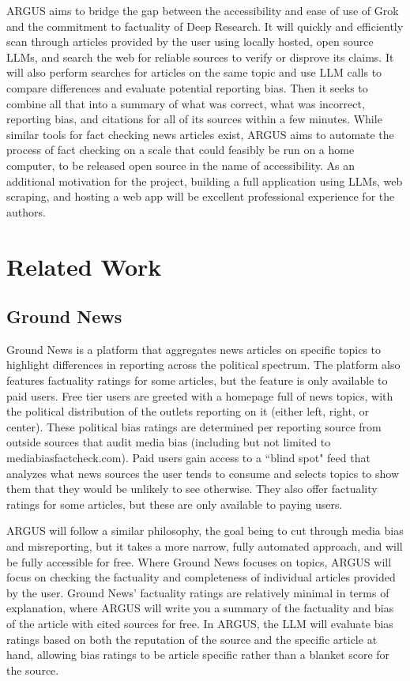 \documentclass[conference]{IEEEtran}
\begin{document}
ARGUS aims to bridge the gap between the accessibility and ease of use of Grok and the commitment to factuality of Deep Research. It will quickly and efficiently scan through articles provided by the user using locally hosted, open source LLMs, and search the web for reliable sources to verify or disprove its claims. It will also perform searches for articles on the same topic and use LLM calls to compare differences and evaluate potential reporting bias. Then it seeks to combine all that into a summary of what was correct, what was incorrect, reporting bias, and citations for all of its sources within a few minutes. While similar tools for fact checking news articles exist, ARGUS aims to automate the process of fact checking on a scale that could feasibly be run on a home computer, to be released open source in the name of accessibility. As an additional motivation for the project, building a full application using LLMs, web scraping, and hosting a web app will be excellent professional experience for the authors.

\section{Related Work}

\subsection{Ground News}
Ground News is a platform that aggregates news articles on specific topics to highlight differences in reporting across the political spectrum\cite{groundNews}. The platform also features factuality ratings for some articles, but the feature is only available to paid users\cite{groundNewsSubscriptions}. Free tier users are greeted with a homepage full of news topics, with the political distribution of the outlets reporting on it (either left, right, or center). These political bias ratings are determined per reporting source from outside sources that audit media bias (including but not limited to mediabiasfactcheck.com). Paid users gain access to a ``blind spot" feed that analyzes what news sources the user tends to consume and selects topics to show them that they would be unlikely to see otherwise. They also offer factuality ratings for some articles, but these are only available to paying users\cite{groundNews}.

ARGUS will follow a similar philosophy, the goal being to cut through media bias and misreporting, but it takes a more narrow, fully automated approach, and will be fully accessible for free. Where Ground News focuses on topics, ARGUS will focus on checking the factuality and completeness of individual articles provided by the user. Ground News' factuality ratings are relatively minimal in terms of explanation, where ARGUS will write you a summary of the factuality and bias of the article with cited sources for free. In ARGUS, the LLM will evaluate bias ratings based on both the reputation of the source and the specific article at hand, allowing bias ratings to be article specific rather than a blanket score for the source.
\end{document}
